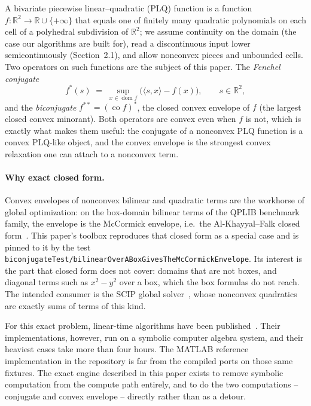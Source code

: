 \documentclass[11pt]{article}
\theoremstyle{definition}
\newcommand{\R}{\mathbb{R}}
\DeclareMathOperator{\dom}{dom}
\DeclareMathOperator{\co}{co}
\begin{document}
A bivariate piecewise linear--quadratic (PLQ) function is a function
$f:\R^2\to\R\cup\{+\infty\}$ that equals one of finitely many quadratic
polynomials on each cell of a polyhedral subdivision of $\R^2$; we assume
continuity on the domain (the case our algorithms are built for), read a
discontinuous input lower semicontinuously (Section~2.1), and allow
nonconvex pieces and unbounded cells. Two operators on such functions are the
subject of this paper. The \emph{Fenchel conjugate}
\[
  f^*(s) \;=\; \sup_{x\in\dom f}\bigl(\langle s,x\rangle - f(x)\bigr),
\qquad s\in\R^2,
\]
and the \emph{biconjugate} $f^{**} = (\co f)^*$, the closed convex envelope of
$f$ (the largest closed convex minorant).
 Both
operators are convex even when $f$ is not, which is exactly what makes them
useful: the conjugate of a nonconvex PLQ function is a convex PLQ-like object,
and the convex envelope is the strongest convex relaxation one can attach to a
nonconvex term.

\paragraph{Why exact closed form.}
Convex envelopes of nonconvex bilinear and quadratic terms are the workhorse of
global optimization: on the box-domain bilinear terms of the QPLIB benchmark
family, the envelope is the McCormick envelope, i.e.\ the Al-Khayyal--Falk
closed form~\cite{MCCORMICK-76,ALKHYAYAL-83}. This paper's toolbox reproduces
that closed form as a special case and is pinned to it by the test
\texttt{biconjugateTest/bilinearOverABoxGivesTheMcCormickEnvelope}.
 Its interest is the part that closed form does not cover: domains
that are not boxes, and diagonal terms such as $x^2-y^2$ over a box, which the
box formulas do not reach.
 The intended consumer is the SCIP global
solver~\cite{ACHTERBERG-09}, whose nonconvex quadratics are exactly sums of
terms of this kind.

For this exact problem, linear-time algorithms have been
published~\cite{KARMARKAR-25,KARMARKAR-25a}. Their implementations, however,
run on a symbolic computer algebra system, and their heaviest cases take more
than four hours.
 The MATLAB reference implementation in the repository is
far from the compiled ports on those same fixtures.
 The exact engine
described in this paper exists to remove symbolic computation from the compute
path entirely, and to do the two computations -- conjugate and convex envelope
-- directly rather than as a detour.
\end{document}
